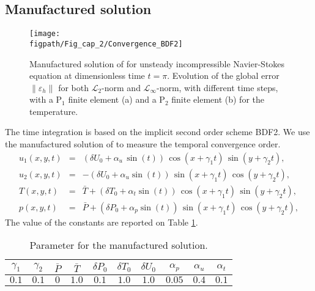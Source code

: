 \subsection{Manufactured solution} \label{subsub-conv-nourg}
\begin{figure}
	\begin{center}
		\texttt{[image: \\figpath/Fig\_cap\_2/Convergence\_BDF2]} 
	\end{center}
	\caption{Manufactured solution of \cite{nourgaliev2016fully} for unsteady incompressible Navier-Stokes equation at dimensionless time $t = \pi$. Evolution of the global error $\| \varepsilon_h \|$ for both $\mathcal{L}_2$-norm and $\mathcal{L}_\infty$-norm, with different time steps, with a P$_1$ finite element (a) and a P$_2$ finite element (b) for the temperature.}
	\label{fig-conv-bdf2}
\end{figure}

The time integration is based on the implicit second order scheme BDF2.
We use the manufactured solution of \cite{nourgaliev2016fully} to measure the temporal convergence order.
\begin{eqnarray}
	u_1(x,y,t) &=& \left( \delta U_0 + \alpha_u \, \sin(t) \right) \, \cos(x+ \gamma_1 t) \, \sin(y+ \gamma_2 t), \\ \nonumber
	u_2(x,y,t) &=& - \left( \delta U_0 + \alpha_u \sin(t) \right) \, \sin(x+ \gamma_1 t) \, \cos(y+ \gamma_2 t), \\ \nonumber
	T(x,y,t) &=& \bar{T} + \left( \delta T_0 + \alpha_t \sin(t) \right) \, \cos(x+ \gamma_1 t) \, \sin(y+ \gamma_2 t), \\ \nonumber
	p(x,y,t) &=& \bar{P} + \left(\delta P_0 + \alpha_p \sin(t) \right) \, \sin(x+ \gamma_1 t) \, \cos(y+ \gamma_2 t), 
\end{eqnarray}
The value of the constants are reported on Table \ref{tab-constant}.
\begin{table}[!h]
\centering
\begin{tabular}{*{10}{c}}
  $\gamma_1$ & $\gamma_2$ & $\bar{P}$ & $\bar{T}$ & $\delta P_0$ & $\delta T_0$ & $\delta U_0$ & $\alpha_p$ & $\alpha_u$ & $\alpha_t$\\
   \midrule
  $0.1$ & $0.1$ & $0$ & $1.0$ &  $0.1$ & $1.0$ & $1.0$ & $0.05$ & $0.4$ & $0.1$ \\

 \end{tabular}
\caption{Parameter for the manufactured solution.}
\label{tab-constant}
\end{table}

